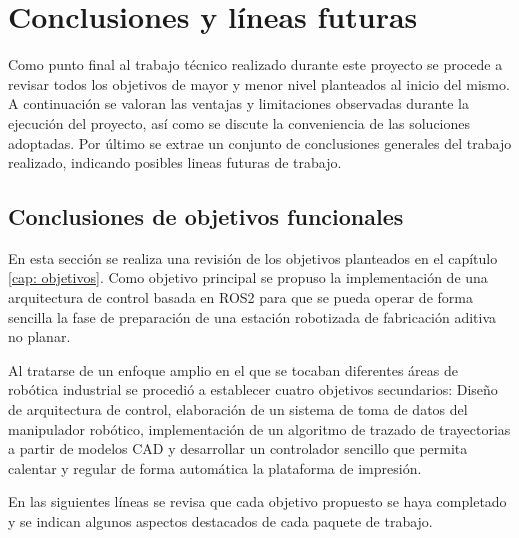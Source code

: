\chapter{Conclusiones y líneas futuras}
\label{cap:discusion_conclusiones}

Como punto final al trabajo técnico realizado durante este proyecto   
se procede a revisar todos los objetivos de mayor y menor nivel planteados al inicio del mismo. A continuación se valoran las ventajas y limitaciones observadas durante la ejecución del proyecto, así como se discute la conveniencia de las soluciones adoptadas. Por último se extrae un conjunto de conclusiones generales del trabajo realizado, indicando posibles lineas futuras de trabajo.

\section{Conclusiones de objetivos funcionales}
En esta sección se realiza una revisión de los objetivos planteados en el capítulo \ref{cap: objetivos}. Como objetivo principal se propuso la implementación de una arquitectura de control basada en ROS2 para que se pueda operar de forma sencilla la fase de preparación de una estación robotizada de fabricación aditiva no planar. 

Al tratarse de un enfoque amplio en el que se tocaban diferentes áreas de robótica industrial se procedió a establecer cuatro objetivos secundarios: Diseño de arquitectura de control, elaboración de un sistema de toma de datos del manipulador robótico, implementación de un algoritmo de trazado de trayectorias a partir de modelos \acrshort{CAD} y desarrollar un controlador sencillo que permita calentar y regular de forma automática la plataforma de impresión. 

En las siguientes líneas se revisa que cada objetivo propuesto se haya completado y se indican algunos aspectos destacados de cada paquete de trabajo.

